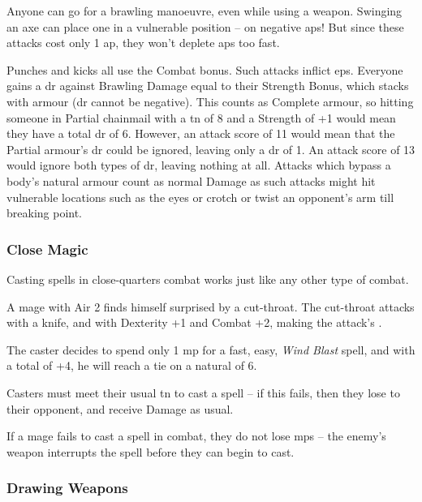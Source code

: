 \begin{multicols}{2}
Anyone can go for a brawling manoeuvre, even while using a weapon.
Swinging an axe can place one in a vulnerable position -- on negative \glspl{ap}!
But since these attacks cost only 1 \gls{ap}, they won't deplete \glspl{ap} too fast.

Punches and kicks all use the Combat bonus.
Such attacks inflict \glspl{ep}.
Everyone gains a \gls{dr} against Brawling Damage equal to their Strength Bonus, which stacks with armour (\gls{dr} cannot be negative).
This counts as Complete armour, so hitting someone in Partial chainmail with a \gls{tn} of 8 and a Strength of +1 would mean they have a total \gls{dr} of 6.
However, an attack score of 11 would mean that the Partial armour's \gls{dr} could be ignored, leaving only a \gls{dr} of 1.
An attack score of 13 would ignore both types of \gls{dr}, leaving nothing at all.
Attacks which bypass a body's natural armour count as normal Damage as such attacks might hit vulnerable locations such as the eyes or crotch or twist an opponent's arm till breaking point.

\subsubsection[Close Magic: Casters roll vs the enemy's standard Attack score]{Close Magic}

Casting spells in close-quarters combat works just like any other type of combat.

\begin{exampletext}
  A mage with Air 2 finds himself surprised by a cut-throat.
  The cut-throat attacks with a knife, and with Dexterity +1 and Combat +2, making the attack's \tn[10].

  The caster decides to spend only 1 \gls{mp} for a fast, easy, \textit{Wind Blast} spell, and with a  total of +4, he will reach a tie on a \gls{natural} of 6.
\end{exampletext}

Casters must meet their usual \gls{tn} to cast a spell -- if this fails, then they lose to their opponent, and receive Damage as usual.

If a mage fails to cast a spell in combat, they do not lose \glspl{mp} -- the enemy's weapon interrupts the spell before they can begin to cast.

\subsubsection[Drawing Weapon -- Cost: 1 \glsentrytext{ap}]{Drawing Weapons}


\end{multicols}

